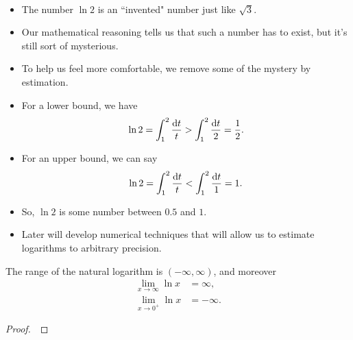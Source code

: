\begin{remark}\,
\begin{itemize}
\item The number $\ln 2$ is an ``invented" number just like $\sqrt 3$.
\item Our mathematical reasoning tells us that such a number has to exist, but it's still sort of mysterious.
\item To help us feel more comfortable, we remove some of the mystery by estimation.
\item For a lower bound, we have
    \begin{equation*}
        \ln 2 
		= \int_{1}^{2} \frac{\mathrm{d} t}{t} 
		>\int_1^2\frac{\mathrm{d} t}{2}
		= \frac{1}{2}.
    \end{equation*} 
\item For an upper bound, we can say
    \begin{equation*}
        \ln 2 
		= \int_{1}^{2} \frac{\mathrm{d} t}{t} 
		<\int_1^2\frac{\mathrm{d} t}{1}
		= 1.
    \end{equation*} 
\item So, $\ln 2$ is some number between $0.5$ and $1$.
\item Later will develop numerical techniques that will allow us to estimate logarithms to arbitrary precision.
\end{itemize}
\end{remark}

\begin{theorem}
The range of the natural logarithm is $(-\infty, \infty)$, and moreover
\begin{align*}
\lim_{x\to \infty}\ln x &= \infty,\\
\lim_{x\to 0^+}\ln x &=-\infty.
\end{align*}
\end{theorem}

\ifdefined\SOLUTION
{}
\else
\begin{proof}\,

\vspace{2.5in}
\end{proof}
\fi




